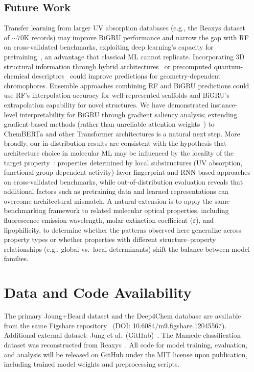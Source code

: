 \documentclass[journal=jcisd8,manuscript=article]{achemso}
\begin{document}
\subsection*{Future Work}
Transfer learning from larger UV absorption databases (e.g., the Reaxys dataset of $\sim$70K records) may improve BiGRU performance and narrow the gap with RF on cross-validated benchmarks, exploiting deep learning's capacity for pretraining~\cite{vermeire2021transfer}, an advantage that classical ML cannot replicate.
Incorporating 3D structural information through hybrid architectures~\cite{gilmer2017neural} or precomputed quantum-chemical descriptors~\cite{lupopasini2023excited} could improve predictions for geometry-dependent chromophores.
Ensemble approaches combining RF and BiGRU predictions could use RF's interpolation accuracy for well-represented scaffolds and BiGRU's extrapolation capability for novel structures.
We have demonstrated instance-level interpretability for BiGRU through gradient saliency analysis; extending gradient-based methods (rather than unreliable attention weights~\cite{jain2019attention}) to ChemBERTa and other Transformer architectures is a natural next step.
More broadly, our in-distribution results are consistent with the hypothesis that architecture choice in molecular ML may be influenced by the locality of the target property~\cite{chenMolecularLanguage2023, jiang2023trangru}: properties determined by local substructures (UV absorption, functional group-dependent activity) favor fingerprint and RNN-based approaches on cross-validated benchmarks, while out-of-distribution evaluation reveals that additional factors such as pretraining data and learned representations can overcome architectural mismatch.
A natural extension is to apply the same benchmarking framework to related molecular optical properties, including fluorescence emission wavelength, molar extinction coefficient ($\varepsilon$), and lipophilicity, to determine whether the patterns observed here generalize across property types or whether properties with different structure--property relationships (e.g., global vs.\ local determinants) shift the balance between model families.


\section*{Data and Code Availability}
The primary Joung+Beard dataset and the Deep4Chem database are available from the same Figshare repository~\cite{joung2020experimental, beard2019comparative} (DOI: 10.6084/m9.figshare.12045567).
Additional external dataset: Jung et al.\ (GitHub)~\cite{jung2024machine}.
The Mamede classification dataset was reconstructed from Reaxys~\cite{mamede2021machine}.
All code for model training, evaluation, and analysis will be released on GitHub under the MIT license upon publication, including trained model weights and preprocessing scripts.
\end{document}

